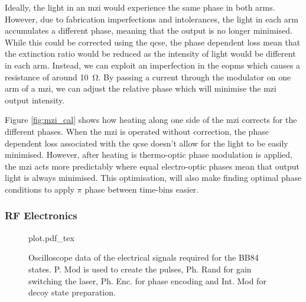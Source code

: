 

Ideally, the light in an \ac{mzi} would experience the same phase in both arms. However, due to fabrication imperfections and intolerances, the light in each arm accumulates a different phase, meaning that the output is no longer minimised. While this could be corrected using the \ac{qcse}, the phase dependent loss mean that the extinction ratio would be reduced as the intensity of light would be different in each arm. Instead, we can exploit an imperfection in the \acp{eopm} which causes a resistance of around \SI{10}{\ohm}. By passing a current through the modulator on one arm of a \ac{mzi}, we can adjust the relative phase which will minimise the \ac{mzi} output intensity.

Figure \ref{fig:mzi_cal} shows how heating along one side of the \ac{mzi} corrects for the different phases. When the \ac{mzi} is operated without correction, the phase dependent loss associated with the \ac{qcse} doesn't allow for the light to be easily minimised. However, after heating is thermo-optic phase modulation is applied, the \ac{mzi} acts more predictably where equal electro-optic phases mean that output light is always minimised. This optimisation, will also make finding optimal phase conditions to apply $\pi$ phase between time-bins easier.



\subsubsection*{RF Electronics}

\begin{figure}[tbp]
	\centering
	\def\svgwidth{\textwidth} 
	{plot.pdf_tex}
	\caption[Electrical signals for BB84 state generation]{Oscilloscope data of the electrical signals required for the BB84 states. P. Mod is used to create the pulses, Ph. Rand for gain switching the laser, Ph. Enc. for phase encoding and Int. Mod for decoy state preparation.}
	\label{fig:elec_signals}
\end{figure}

